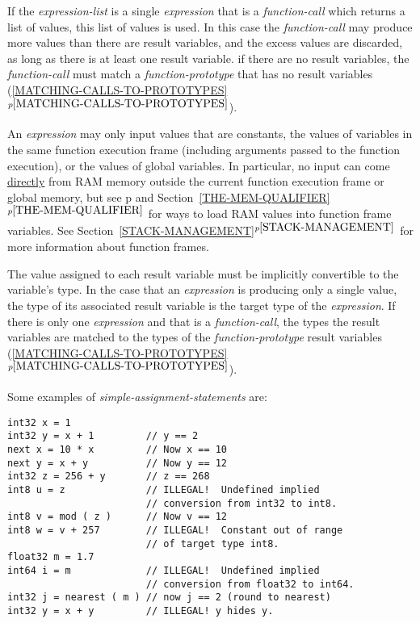 \documentclass[12pt]{article}
\newcommand{\itemref}[1]{\ref{#1}$^{p\pageref{#1}}$}
\newcommand{\pagref}[1]{p\pageref{#1}}
\newenvironment{indpar}[1][0.3in]%
	{\begin{list}{}%
		     {\setlength{\itemsep}{0in}%
		      \setlength{\topsep}{0in}%
		      \setlength{\parsep}{1ex}%
		      \setlength{\labelwidth}{#1}%
		      \setlength{\leftmargin}{#1}%
		      \addtolength{\leftmargin}{\labelsep}}%
	 \item}%
	{\end{list}}
\begin{document}
If the {\em expression-list} is a single {\em expression} that
is a {\em function-call} which
returns a list of values, this list of values is used.
In this case the {\em function-call} may produce more values than
there are result variables, and the excess values are discarded,
as long as there is at least one result variable.
if there are no result variables, the
{\em function-call} must match a {\em function-prototype} that has
no result variables (\itemref{MATCHING-CALLS-TO-PROTOTYPES}).

An {\em expression} may only input values that are constants,
the values of variables in the same function execution
frame (including arguments passed to the function execution), 
or the values of global variables.  In particular,
no input can come \underline{directly}
from RAM memory outside the current function execution frame or
global memory,
but see \pagref{MEM} and Section~\itemref{THE-MEM-QUALIFIER}
for ways to load RAM values into function frame variables.
See Section~\itemref{STACK-MANAGEMENT} for more information about
function frames.

The value assigned to each result variable must be implicitly convertible to
the variable's type.
In the case that an {\em expression} is producing
only a single value, the type of its associated result variable is the target
type of the {\em expression}.  If there is only one {\em expression}
and that is a {\em function-call}, the types the result variables
are matched to the types of the {\em function-prototype} result
variables (\itemref{MATCHING-CALLS-TO-PROTOTYPES}).

Some examples of {\em simple-assignment-statements} are:
\begin{indpar}\begin{verbatim}
int32 x = 1
int32 y = x + 1         // y == 2
next x = 10 * x         // Now x == 10
next y = x + y          // Now y == 12
int32 z = 256 + y       // z == 268
int8 u = z              // ILLEGAL!  Undefined implied
                        // conversion from int32 to int8.
int8 v = mod ( z )      // Now v == 12
int8 w = v + 257        // ILLEGAL!  Constant out of range
                        // of target type int8.
float32 m = 1.7
int64 i = m             // ILLEGAL!  Undefined implied
                        // conversion from float32 to int64.
int32 j = nearest ( m ) // now j == 2 (round to nearest)
int32 y = x + y         // ILLEGAL! y hides y.
\end{verbatim}\end{indpar}
\end{document}
